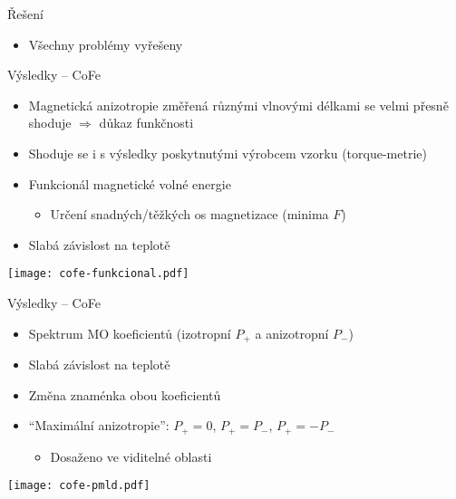 \documentclass{beamer}
\begin{document}
\begin{frame}{Řešení}
\begin{itemize}
\begin{enumerate}
{\begin{itemize}
        \end{itemize}}
            \end{enumerate}
        \item<10-> Všechny problémy vyřešeny
    \end{itemize}
\end{frame}



\begin{frame}{Výsledky -- CoFe}
    \begin{itemize}
        \item Magnetická anizotropie změřená různými vlnovými délkami se velmi přesně shoduje $\Rightarrow$ důkaz funkčnosti
            \pause
        \item Shoduje se i s výsledky poskytnutými výrobcem vzorku (torque-metrie)
            \pause
        \item Funkcionál magnetické volné energie
            \begin{itemize}
                \item Určení snadných/těžkých os magnetizace (minima $F$)
            \end{itemize}
        \item<4> Slabá závislost na teplotě
    \end{itemize}
    \texttt{[image: cofe-funkcional.pdf]}    
\end{frame}


\begin{frame}{Výsledky -- CoFe}
    \begin{itemize}
        \item Spektrum MO koeficientů (izotropní $P_+$ a anizotropní $P_-$)
        \item<2-> Slabá závislost na teplotě
        \item<3-> Změna znaménka obou koeficientů
        \item<4-> ``Maximální anizotropie'': $P_+=0$, $P_+=P_-$, $P_+=-P_-$
            \begin{itemize}
                \item<3-> Dosaženo ve viditelné oblasti
            \end{itemize}
   \end{itemize} 
   \vspace{0.1cm}
   \hspace{0.1cm}\begin{center}\texttt{[image: cofe-pmld.pdf]}\end{center}
\end{frame}
\end{document}
